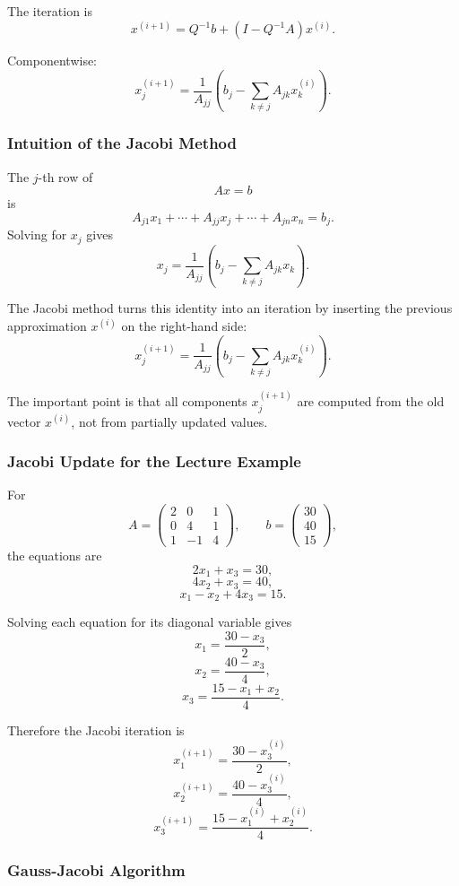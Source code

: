 \documentclass[10pt, letterpaper]{article}
\begin{document}
The iteration is
\[
x^{(i+1)}
=
Q^{-1}b+(I-Q^{-1}A)x^{(i)}.
\]

Componentwise:
\[
x_j^{(i+1)}
=
\frac{1}{A_{jj}}
\left(
b_j-\sum_{k\neq j}A_{jk}x_k^{(i)}
\right).
\]

\subsubsection{Intuition of the Jacobi Method}

The \(j\)-th row of
\[
Ax=b
\]
is
\[
A_{j1}x_1+\cdots+A_{jj}x_j+\cdots+A_{jn}x_n=b_j.
\]
Solving for \(x_j\) gives
\[
x_j
=
\frac{1}{A_{jj}}
\left(
b_j-\sum_{k\neq j}A_{jk}x_k
\right).
\]

The Jacobi method turns this identity into an iteration by inserting the previous approximation \(x^{(i)}\) on the right-hand side:
\[
x_j^{(i+1)}
=
\frac{1}{A_{jj}}
\left(
b_j-\sum_{k\neq j}A_{jk}x_k^{(i)}
\right).
\]

The important point is that all components \(x_j^{(i+1)}\) are computed from the old vector \(x^{(i)}\), not from partially updated values.

\subsubsection{Jacobi Update for the Lecture Example}

For
\[
A=
\begin{pmatrix}
2&0&1\\
0&4&1\\
1&-1&4
\end{pmatrix},
\qquad
b=
\begin{pmatrix}
30\\
40\\
15
\end{pmatrix},
\]
the equations are
\[
2x_1+x_3=30,
\]
\[
4x_2+x_3=40,
\]
\[
x_1-x_2+4x_3=15.
\]

Solving each equation for its diagonal variable gives
\[
x_1=\frac{30-x_3}{2},
\]
\[
x_2=\frac{40-x_3}{4},
\]
\[
x_3=\frac{15-x_1+x_2}{4}.
\]

Therefore the Jacobi iteration is
\[
x_1^{(i+1)}
=
\frac{30-x_3^{(i)}}{2},
\]
\[
x_2^{(i+1)}
=
\frac{40-x_3^{(i)}}{4},
\]
\[
x_3^{(i+1)}
=
\frac{15-x_1^{(i)}+x_2^{(i)}}{4}.
\]

\subsubsection{Gauss-Jacobi Algorithm}
\end{document}
